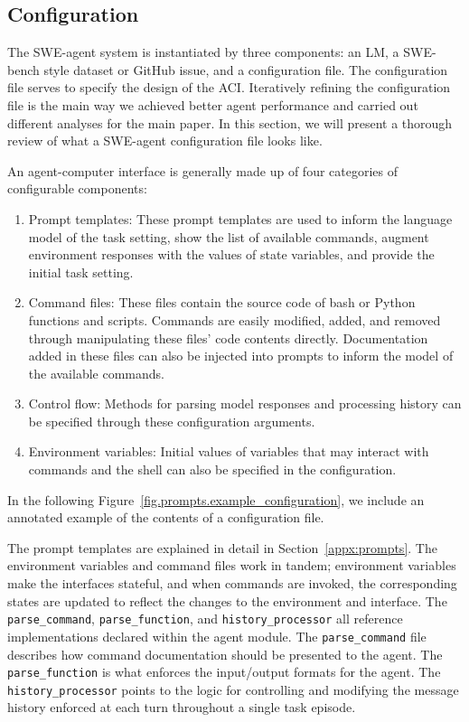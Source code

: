 \subsection{Configuration}
\label{appx:interface:configuration}
The SWE-agent system is instantiated by three components: an LM, a SWE-bench style dataset or GitHub issue, and a configuration file.
The configuration file serves to specify the design of the ACI.
Iteratively refining the configuration file is the main way we achieved better agent performance and carried out different analyses for the main paper.
In this section, we will present a thorough review of what a SWE-agent configuration file looks like.

An agent-computer interface is generally made up of four categories of configurable components:
\begin{enumerate}
    \item Prompt templates: These prompt templates are used to inform the language model of the task setting, show the list of available commands, augment environment responses with the values of state variables, and provide the initial task setting.
    \item Command files: These files contain the source code of bash or Python functions and scripts. Commands are easily modified, added, and removed through manipulating these files' code contents directly. Documentation added in these files can also be injected into prompts to inform the model of the available commands.
    \item Control flow: Methods for parsing model responses and processing history can be specified through these configuration arguments.
    \item Environment variables: Initial values of variables that may interact with commands and the shell can also be specified in the configuration.
\end{enumerate}

In the following Figure~\ref{fig.prompts.example_configuration}, we include an annotated example of the contents of a configuration file.



The prompt templates are explained in detail in Section~\ref{appx:prompts}.
The environment variables and command files work in tandem; environment variables make the interfaces stateful, and when commands are invoked, the corresponding states are updated to reflect the changes to the environment and interface.
The \texttt{parse\_command}, \texttt{parse\_function}, and \texttt{history\_processor} all reference implementations declared within the agent module.
The \texttt{parse\_command} file describes how command documentation should be presented to the agent.
The \texttt{parse\_function} is what enforces the input/output formats for the agent.
The \texttt{history\_processor} points to the logic for controlling and modifying the message history enforced at each turn throughout a single task episode.

